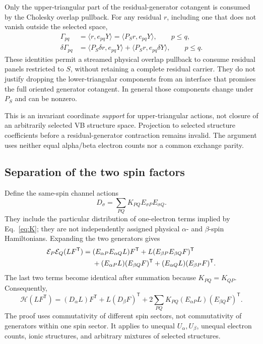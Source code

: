 \documentclass[11pt,a4paper]{article}
\newcommand{\Tr}{^{\mathsf T}}
\newcommand{\Ha}{\mathcal H}
\newcommand{\Ea}{\mathcal E}
\begin{document}
Only the upper-triangular part of the residual-generator cotangent is
consumed by the Cholesky overlap pullback. For any residual $r$, including
one that does not vanish outside the selected space,
\begin{align}
 \Gamma_{pq}&=\langle r,e_{pq}Y\rangle
             =\langle P_Sr,e_{pq}Y\rangle,\qquad p\le q,\\
 \delta\Gamma_{pq}&=\langle P_S\delta r,e_{pq}Y\rangle
                  +\langle P_Sr,e_{pq}\delta Y\rangle,
                  \qquad p\le q.
 \label{eq:upper-residual-projection}
\end{align}
These identities permit a streamed physical overlap pullback to consume
residual panels restricted to $S$, without retaining a complete residual
carrier. They do not justify dropping the lower-triangular components from
an interface that promises the full oriented generator cotangent. In general
those components change under $P_S$ and can be nonzero.

This is an invariant coordinate \emph{support} for upper-triangular actions,
not closure of an arbitrarily selected VB structure space. Projection to
selected structure coefficients before a residual-generator contraction
remains invalid. The argument uses neither equal alpha/beta electron counts
nor a common exchange parity.

\subsection{Separation of the two spin factors}

Define the same-spin channel actions
\begin{equation}
 D_\sigma=\sum_{PQ}K_{PQ}E_{\sigma P}E_{\sigma Q}.
\end{equation}
They include the particular distribution of one-electron terms implied
by Eq.~\eqref{eq:K}; they are not independently assigned physical
$\alpha$- and $\beta$-spin Hamiltonians. Expanding the two generators gives
\begin{align}
 \Ea_P\Ea_Q(LF\Tr)={}&
 (E_{\alpha P}E_{\alpha Q}L)F\Tr
 +L(E_{\beta P}E_{\beta Q}F)\Tr\notag\\
 &+(E_{\alpha P}L)(E_{\beta Q}F)\Tr
 +(E_{\alpha Q}L)(E_{\beta P}F)\Tr.
\end{align}
The last two terms become identical after summation because $K_{PQ}=K_{QP}$.
Consequently,
\begin{equation}\label{eq:Hfactor}
 \boxed{\ \Ha(LF\Tr)=(D_\alpha L)F\Tr+L(D_\beta F)\Tr
 +2\sum_{PQ}K_{PQ}(E_{\alpha P}L)(E_{\beta Q}F)\Tr.\ }
\end{equation}
The proof uses commutativity of different spin sectors, not commutativity
of generators within one spin sector. It applies to unequal
$U_\alpha,U_\beta$, unequal electron counts, ionic structures, and arbitrary
mixtures of selected structures.
\end{document}
